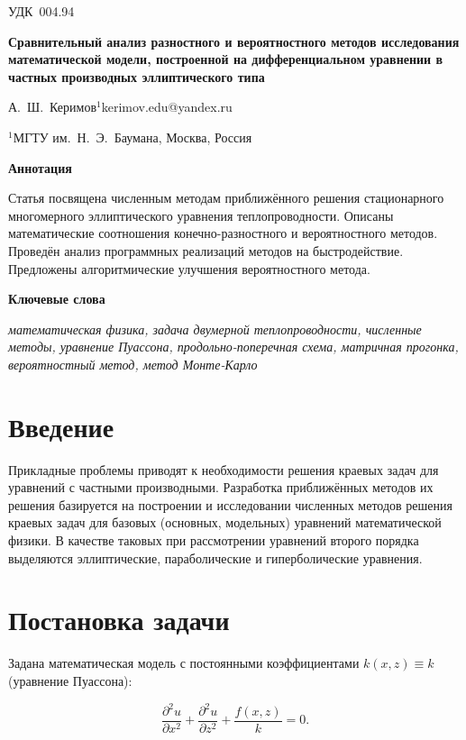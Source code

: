 \documentclass[12pt, a4paper]{article}
\begin{document}
\noindent УДК~004.94

\hfill

\noindent \textbf{Сравнительный анализ разностного и вероятностного методов исследования математической модели, построенной на дифференциальном уравнении в частных производных эллиптического типа}

\noindent А.~Ш.~Керимов$^{1}$\hfill kerimov.edu@yandex.ru

\noindent $^{1}$МГТУ им.~Н.~Э.~Баумана, Москва, Россия

\hfill

\noindent \textbf{Аннотация}

\noindent Статья посвящена численным методам приближённого решения стационарного многомерного эллиптического уравнения теплопроводности.
Описаны математические соотношения конечно-разностного и вероятностного методов. Проведён анализ программных реализаций методов на быстродействие. Предложены алгоритмические улучшения вероятностного метода.

\noindent \textbf{Ключевые слова}

\noindent \textit{математическая физика, задача двумерной теплопроводности, численные методы, уравнение Пуассона, продольно-поперечная схема, матричная прогонка, вероятностный метод, метод Монте-Карло}

\hfill

\section*{Введение}

Прикладные проблемы приводят к необходимости решения краевых задач для уравнений с частными производными. Разработка приближённых методов их решения базируется на построении и исследовании численных методов решения краевых задач для базовых (основных, модельных) уравнений математической физики. В качестве таковых при рассмотрении уравнений второго порядка выделяются эллиптические, параболические и гиперболические уравнения.

\section{Постановка задачи}

Задана математическая модель с постоянными коэффициентами $k(x, z) \equiv k$ (уравнение Пуассона):

\begin{equation}
	\label{eqn:source}
	\frac{\partial^2 u}{\partial x^2} + \frac{\partial^2 u}{\partial z^2} + \frac{f(x, z)}{k} = 0.
\end{equation}
\end{document}
